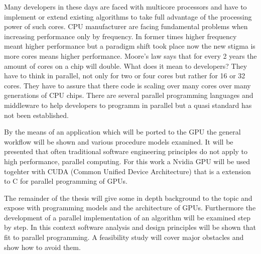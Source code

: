 Many developers in these days are faced with multicore processors and have to
implement or extend existing algorithms to take full advantage of the
processing power of such cores. CPU manufacturer are facing fundamental problems
when increasing performance only by frequency. In former times higher frequency
meant higher performance but a paradigm shift took place now the new stigma is
more cores means higher performance. Moore's law says that for every 2 years the
amount of cores on a chip will double. What does it mean to developers? They
have to think in parallel, not only for two or four cores but rather for 16 or
32 cores. They have to assure that there code is scaling over many cores over
many generations of CPU chips. There are several parallel programming languages
and middleware to help developers to programm in parallel but a quasi standard
has not been established.

By the means of an application which will be ported to the \gls{GPU} the general
workflow will be shown and various procedure models examined. It will be
presented that often traditional software engineering principles do not
apply to high performance, parallel computing. For this work a Nvidia \gls{GPU} will
be used togehter with CUDA (Common Unified Device Architecture) that is a
extension to C for parallel programming of GPUs. 

The remainder of the thesis will give some in depth background to the topic and
expose with programming models and the architecture of GPUs. Furthermore the
development of a parallel implementation of an algorithm will be examined step
by step. In this context software analysis and design principles will be shown
that fit to parallel programming. A feasibility study will cover major obstacles
and show how to avoid them.



